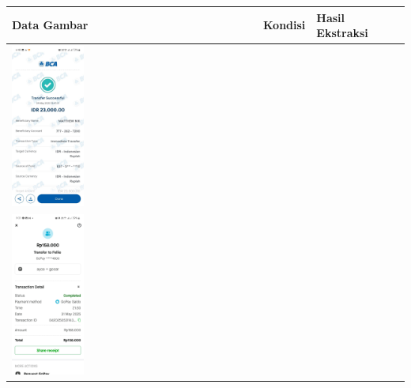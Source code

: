 \begin{table}[htbp]
    \centering
    \begin{tabularx}{\textwidth}{|p{4.2cm}|X|X|X|}
        \hline
        \textbf{Data Gambar} & \textbf{Kondisi} & \textbf{Hasil Ekstraksi} \\ \hline
        \includegraphics[width=0.3\textwidth]{images/contoh-data/tf-1.jpg} & 
         & 
         \\ \hline
        \includegraphics[width=0.3\textwidth]{images/contoh-data/tf-2.jpg} & 
         & 
         \\ \hline
    \end{tabularx}
\end{table}

